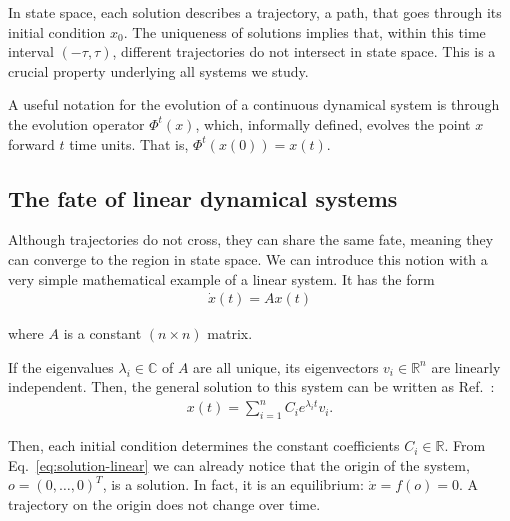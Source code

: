 In state space, each solution describes a trajectory, a path, that goes through its initial condition $x_0$. The uniqueness of solutions implies that, within this time interval $(-\tau, \tau)$, different trajectories do not intersect in state space. This is a crucial property underlying all systems we study. 

A useful notation for the evolution of a continuous dynamical system is through the evolution operator $\Phi^t(x)$, which, informally defined, evolves the point $x$ forward $t$ time units. That is, $\Phi^t(x(0)) = x(t)$.

\subsection{The fate of linear dynamical systems}\label{method:linear-system}
Although trajectories do not cross, they can share the same fate, meaning they can converge to the region in state space. We can introduce this notion with a very simple mathematical example of a linear system. It has the form
% 
\begin{align}
    \dot{x}(t) = A x(t)
    \label{eq:linear}
\end{align}

where $A$ is a constant $(n \times n)$ matrix. %

If the eigenvalues $\lambda_i \in \mathbb{C}$ of $A$ are all unique, its eigenvectors $v_i \in \mathbb{R}^n$ are linearly independent. Then, the general solution to this system can be written as Ref.~\cite{strogatz2002nonlinear}:
%
\begin{align}\label{eq:solution-linear}
    x(t) = \sum_{i=1}^n C_i e^{\lambda_i t} v_i.
\end{align}

Then, each initial condition determines the constant coefficients $C_i \in \mathbb{R}$. 
From Eq.~\ref{eq:solution-linear} we can already notice that the origin of the system, $ o = (0, \ldots, 0)^T$, is a solution. In fact, it is an equilibrium: $\dot{x} = f(o) = 0$. A trajectory on the origin does not change over time.

